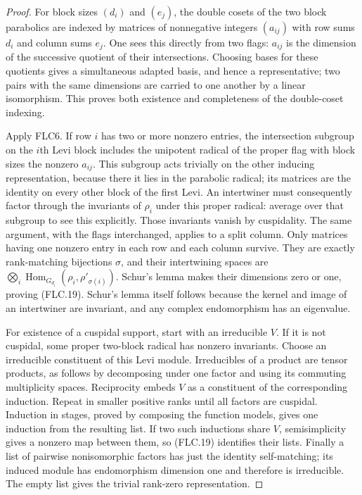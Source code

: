 \documentclass[11pt,a4paper]{article}
\numberwithin{equation}{section}
\theoremstyle{remark}\newtheorem{remark}[theorem]{Remark}
\begin{document}
\begin{proof}
For block sizes $(d_i)$ and $(e_j)$, the double cosets of the
two block parabolics are indexed by matrices of nonnegative
integers $(a_{ij})$ with row sums $d_i$ and column sums $e_j$.
One sees this directly from two flags: $a_{ij}$ is the dimension
of the successive quotient of their intersections.
Choosing bases for these quotients gives a simultaneous
adapted basis, and hence a representative; two pairs with
the same dimensions are carried to one another by a linear
isomorphism.  This proves both existence and completeness of
the double-coset indexing.

Apply FLC6.  If row $i$ has two or more nonzero entries, the
intersection subgroup on the $i$th Levi block includes the
unipotent radical of the proper flag with block sizes the
nonzero $a_{ij}$.  This subgroup acts trivially on the other
inducing representation, because there it lies in the
parabolic radical; its matrices are the identity on every
other block of the first Levi.  An intertwiner must consequently factor
through the invariants of $\rho_i$ under this proper
radical: average over that subgroup to see this explicitly.
Those invariants vanish by cuspidality.  The same argument,
with the flags interchanged, applies to a split column.
Only matrices having one nonzero entry in each row and each
column survive.  They are exactly rank-matching bijections
$\sigma$, and their intertwining spaces are
$\bigotimes_i\operatorname{Hom}_{G_{d_i}}(\rho_i,\rho'_{\sigma(i)})$.
Schur's lemma makes their dimensions zero or one, proving
(FLC.19).  Schur's lemma itself follows because the kernel
and image of an intertwiner are invariant, and any complex
endomorphism has an eigenvalue.

For existence of a cuspidal support, start with an irreducible
$V$.  If it is not cuspidal, some proper two-block radical
has nonzero invariants.  Choose an irreducible constituent
of this Levi module.  Irreducibles of a product are tensor
products, as follows by decomposing under one factor and
using its commuting multiplicity spaces.  Reciprocity embeds
$V$ as a constituent of the corresponding induction.
Repeat in smaller positive ranks until all factors are
cuspidal.  Induction in stages, proved by composing the
function models, gives one induction from the resulting list.
If two such inductions share $V$, semisimplicity gives a
nonzero map between them, so (FLC.19) identifies their lists.
Finally a list of pairwise nonisomorphic factors has just
the identity self-matching; its induced module has
endomorphism dimension one and therefore is irreducible.
The empty list gives the trivial rank-zero representation.
\end{proof}
\end{document}
